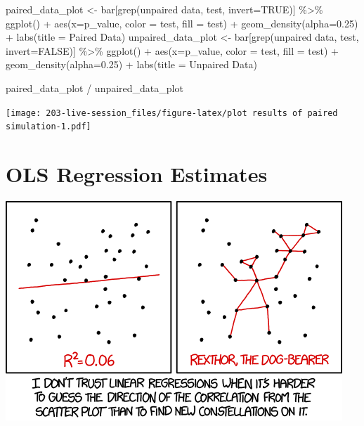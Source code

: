 \documentclass[
]{book}
\newenvironment{Shaded}{\begin{snugshade}}{\end{snugshade}}
\newcommand{\AttributeTok}[1]{\textcolor[rgb]{0.77,0.63,0.00}{#1}}
\newcommand{\ConstantTok}[1]{\textcolor[rgb]{0.00,0.00,0.00}{#1}}
\newcommand{\FloatTok}[1]{\textcolor[rgb]{0.00,0.00,0.81}{#1}}
\newcommand{\FunctionTok}[1]{\textcolor[rgb]{0.00,0.00,0.00}{#1}}
\newcommand{\NormalTok}[1]{#1}
\newcommand{\OtherTok}[1]{\textcolor[rgb]{0.56,0.35,0.01}{#1}}
\newcommand{\SpecialCharTok}[1]{\textcolor[rgb]{0.00,0.00,0.00}{#1}}
\newcommand{\StringTok}[1]{\textcolor[rgb]{0.31,0.60,0.02}{#1}}
\theoremstyle{definition}
\theoremstyle{definition}
\theoremstyle{definition}
\theoremstyle{definition}
\theoremstyle{remark}
\begin{document}
\begin{Shaded}
\begin{Highlighting}[]
\NormalTok{paired\_data\_plot }\OtherTok{\textless{}{-}}\NormalTok{ bar[}\FunctionTok{grep}\NormalTok{(}\StringTok{\textquotesingle{}unpaired data\textquotesingle{}}\NormalTok{, test, }\AttributeTok{invert=}\ConstantTok{TRUE}\NormalTok{)] }\SpecialCharTok{\%\textgreater{}\%} 
  \FunctionTok{ggplot}\NormalTok{() }\SpecialCharTok{+} 
    \FunctionTok{aes}\NormalTok{(}\AttributeTok{x=}\NormalTok{p\_value, }\AttributeTok{color =}\NormalTok{ test, }\AttributeTok{fill =}\NormalTok{ test) }\SpecialCharTok{+} 
    \FunctionTok{geom\_density}\NormalTok{(}\AttributeTok{alpha=}\FloatTok{0.25}\NormalTok{) }\SpecialCharTok{+} 
  \FunctionTok{labs}\NormalTok{(}\AttributeTok{title =} \StringTok{\textquotesingle{}Paired Data\textquotesingle{}}\NormalTok{)}
\NormalTok{unpaired\_data\_plot }\OtherTok{\textless{}{-}}\NormalTok{ bar[}\FunctionTok{grep}\NormalTok{(}\StringTok{\textquotesingle{}unpaired data\textquotesingle{}}\NormalTok{, test, }\AttributeTok{invert=}\ConstantTok{FALSE}\NormalTok{)] }\SpecialCharTok{\%\textgreater{}\%} 
  \FunctionTok{ggplot}\NormalTok{() }\SpecialCharTok{+} 
    \FunctionTok{aes}\NormalTok{(}\AttributeTok{x=}\NormalTok{p\_value, }\AttributeTok{color =}\NormalTok{ test, }\AttributeTok{fill =}\NormalTok{ test) }\SpecialCharTok{+} 
    \FunctionTok{geom\_density}\NormalTok{(}\AttributeTok{alpha=}\FloatTok{0.25}\NormalTok{) }\SpecialCharTok{+} 
  \FunctionTok{labs}\NormalTok{(}\AttributeTok{title =} \StringTok{\textquotesingle{}Unpaired Data\textquotesingle{}}\NormalTok{)}

\NormalTok{paired\_data\_plot }\SpecialCharTok{/}\NormalTok{ unpaired\_data\_plot}
\end{Highlighting}
\end{Shaded}

\texttt{[image: 203-live-session\_files/figure-latex/plot results of paired simulation-1.pdf]}

\hypertarget{ols-regression-estimates}{%
\chapter{OLS Regression Estimates}\label{ols-regression-estimates}}

\includegraphics{./images/linear_regression.png}
\end{document}
